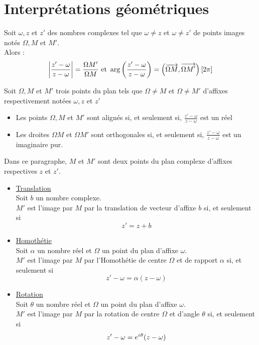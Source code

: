 \section{Interprétations géométriques}
\begin{defprop}
    Soit \(\omega,z \) et \(z'\) des nombres complexes tel que \(\omega \neq z\) et \(\omega \neq z'\) de points images notés \(\Omega,M\) et \(M'\). \\
    Alors : 
    \[\left\lvert\frac{z'-\omega}{z-\omega}\right\rvert = \frac{\Omega M'}{\Omega M} \text{ et } \arg\left(\frac{z'-\omega}{z-\omega}\right) = \left(\overrightarrow{\Omega M},\overrightarrow{\Omega M'}\right)[2\pi]\]

\end{defprop}
\begin{defprop}
     Soit \(\Omega,M \) et \(M'\) trois points du plan tels que \(\Omega \neq M\) et \(\Omega \neq M'\) d'affixes respectivement notées \(\omega,z\) et \(z'\)
     \begin{itemize}
        \item Les points  \(\Omega,M \) et \(M'\) sont alignés si, et seulement si,  \(\frac{z'-\omega}{z-\omega}\) est un réel
        \item Les droites \(\Omega M\) et \(\Omega M'\) sont orthogonales si, et seulement si, \(\frac{z'-\omega}{z-\omega}\) est un imaginaire pur.
     \end{itemize}
\end{defprop}
\begin{defprop}
    Dans ce paragraphe, \(M\) et \(M'\) sont deux points du plan complexe d’affixes respectives \(z\) et \(z'\).
    \begin{itemize}
        \item \underline{Translation} \\
        Soit \(b\) un nombre complexe. \\
        \(M'\) est l'image par \(M\) par la translation de vecteur d'affixe \(b\) si, et seulement si \[z' = z+b\]
        \item \underline{Homothétie} \\
        Soit \(\alpha\) un nombre réel et \(\Omega\) un point du plan d'affixe \(\omega\). \\
        \(M'\) est l'image par \(M\) par l'Homothétie de centre \(\Omega\) et de rapport \(\alpha\)  si, et seulement si \[z'-\omega = \alpha(z-\omega)\]
        \item \underline{Rotation} \\
        Soit \(\theta\) un nombre réel et \(\Omega\) un point du plan d'affixe \(\omega\). \\
        \(M'\) est l'image par \(M\) par la rotation de centre \(\Omega\) et d'angle \(\theta\)  si, et seulement si \[z'-\omega = e^{i\mkern1mu \theta}(z-\omega)\]
    \end{itemize}
\end{defprop}

